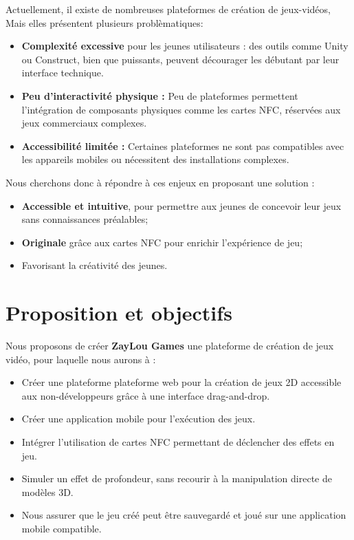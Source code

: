 \documentclass{article}                             %
\begin{document}
Actuellement, il existe de nombreuses plateformes de création de jeux-vidéos,
Mais elles présentent plusieurs problèmatiques:

\begin{itemize}
  \item \textbf{Complexité excessive} pour les jeunes utilisateurs : des outils comme Unity 
  ou Construct, bien que puissants, peuvent décourager les débutant par leur interface technique.
  \item \textbf{Peu d’interactivité physique :} Peu de plateformes permettent l'intégration de composants
    physiques comme les cartes NFC, réservées aux jeux commerciaux complexes.
  \item \textbf{Accessibilité limitée :} Certaines plateformes ne sont pas compatibles avec les appareils mobiles ou 
  nécessitent des installations complexes.
\end{itemize}

Nous cherchons donc à répondre à ces enjeux en proposant une solution :
\begin{itemize}
  \item \textbf{Accessible et intuitive}, pour permettre aux jeunes de concevoir leur jeux sans 
  connaissances préalables;
  \item \textbf{Originale} grâce aux cartes NFC pour enrichir l'expérience de jeu;
  \item Favorisant la créativité des jeunes.
\end{itemize}


\section{Proposition et objectifs}
\label{sec:proposition}                            %
Nous proposons de créer \textbf{ZayLou Games} une plateforme de création de jeux vidéo, pour
laquelle nous aurons à :
\begin{itemize}[leftmargin=1.5em]
  \item Créer une plateforme plateforme web pour la création de jeux 2D accessible aux non-développeurs grâce à une interface drag-and-drop.
  \item Créer une application mobile pour l'exécution des jeux.
  \item Intégrer l’utilisation de cartes NFC permettant de déclencher des effets en jeu.
  \item Simuler un effet de profondeur, sans recourir à la manipulation directe de modèles 3D.
  \item Nous assurer que le jeu créé peut être sauvegardé et joué sur une application mobile compatible.
\end{itemize}
\end{document}
